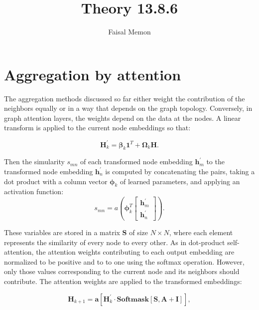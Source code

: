 \documentclass{article}
\title{Theory 13.8.6}
\author{Faisal Memon}
\begin{document}
\maketitle

\section{Aggregation by attention}

The aggregation methods discussed so far either weight the contribution of the neighbors
equally or in a way that depends on the graph topology. Conversely, in graph attention
layers, the weights depend on the data at the nodes. A linear transform is applied to
the current node embeddings so that:

\begin{equation*}
    \mathbf{H}_{k}^{'} = \boldsymbol{\beta}_{k}\mathbf{1}^{T} + \boldsymbol{\Omega}_{k}\mathbf{H}.
\end{equation*}

Then the simularity $ s_{mn} $ of each transformed node embedding $ \mathbf{h}_{m}^{'} $ to the
 transformed node embedding
 $ \mathbf{h}_{n}^{'} $ is computed by concatenating the pairs, taking a dot product
  with a column vector $ \boldsymbol{\phi}_{k} $ of learned parameters, and applying an 
  activation function:
  \begin{equation*}
    s_{mn} = a\left(\boldsymbol{\phi}_{k}^{T}
    \begin{bmatrix}
    \mathbf{h}_{m}^{'} \\ 
    \mathbf{h}_{n}^{'}
    \end{bmatrix}
    \right).
  \end{equation*}

  These variables are stored in a matrix $ \mathbf{S} $ of size $ N \times N $, where each element represents the
  similarity of every node to every other.  As in dot-product self-attention, the attention weights 
  contributing to each output embedding are normalized to be positive and to to one using the softmax operation.
  However, only those values corresponding to the current node and its neighbors should contribute.
  The attention weights are applied to the transformed embeddings:

\begin{equation*}
\mathbf{H}_{k+1} = \mathbf{a}\left[\mathbf{H}_{k}^{'} \cdot \mathbf{Softmask}[\mathbf{S}, \mathbf{A} + \mathbf{I}] \right],
\end{equation*}
\end{document}
